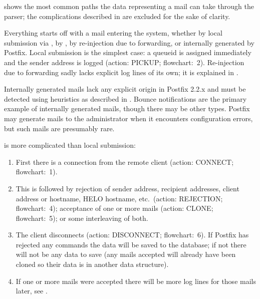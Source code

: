  shows the most common paths the data
representing a mail can take through the parser; the complications
described in  are excluded for the sake of
clarity.


\label{mail-enters-the-system}

Everything starts off with a mail entering the system, whether by local
submission via , by , by re-injection due to
forwarding, or internally generated by Postfix.  Local submission is the
simplest case: a queueid is assigned immediately and the sender address is
logged (action: PICKUP\@; flowchart:~2).  Re-injection due to forwarding
sadly lacks explicit log lines of its own; it is explained in
.

Internally generated mails lack any explicit origin in Postfix 2.2.x and
must be detected using heuristics as described in
.  Bounce notifications are
the primary example of internally generated mails, though there may be
other types.  Postfix may generate mails to the administrator when it
encounters configuration errors, but such mails are presumably rare.

 is more complicated than local submission:

\begin{enumerate}

    \item First there is a connection from the remote client (action:
        CONNECT\@; flowchart:~1).

    \item This is followed by rejection of sender address, recipient
        addresses, client  address or hostname, HELO hostname,
        etc.\ (action: REJECTION\@; flowchart:~4); acceptance of one or
        more mails (action: CLONE\@; flowchart:~5); or some interleaving of
        both.

    \item The client disconnects (action: DISCONNECT\@; flowchart:~6).  If
        Postfix has rejected any  commands the data will be
        saved to the database; if not there will not be any data to save
        (any mails accepted will already have been cloned so their data is
        in another data structure).

    \item If one or more mails were accepted there will be more log lines
        for those mails later, see .

\end{enumerate}


